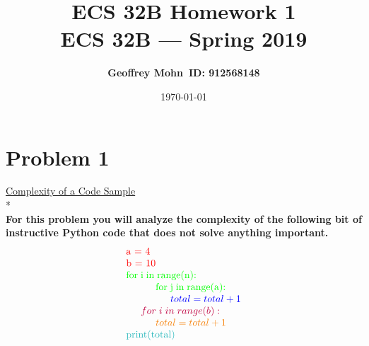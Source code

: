 \documentclass[11pt]{article}
\title{\bf ECS 32B Homework 1\\[2ex] 
	\rm\normalsize ECS 32B --- Spring 2019}
\date{\today}
\author{\bf Geoffrey Mohn\ ID: 912568148}
\begin{document}
	\maketitle
	
	
	\section*{Problem 1} 
	{\underline{Complexity of a Code Sample}}\\*\\
	{\bf For this problem you will analyze the complexity of the following bit of instructive Python code that does not solve anything important.}
\[ \begin{array}{l}
\mbox {\color{red}a = 4}\\
\mbox {\color{red}b = 10}\\
\mbox {\color{green}for\thickspace  i\thickspace  in\thickspace  range(n):}\\
\mbox  {\color{green} \indent \indent for\thickspace j\thickspace in\thickspace range(a):}\\        
\mbox	\indent \indent \indent {\color{blue}total = total + 1}\\
\mbox \indent {\color{purple}for\thickspace i\thickspace in\thickspace range(b):}\\
\mbox  \indent \indent  {\color{BurntOrange}total = total + 1}\\
\mbox {\color{Aquamarine}print(total)}
\end{array}\]
\end{document}
